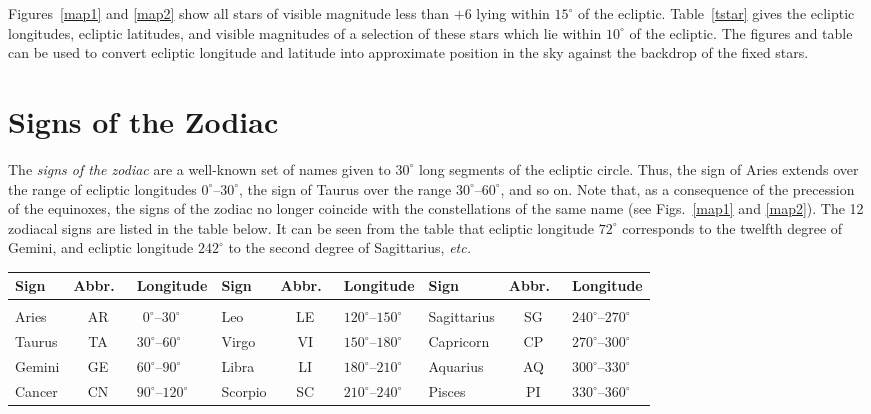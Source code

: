 Figures~\ref{map1} and \ref{map2} show all stars of visible magnitude less than $+6$ lying
within $15^\circ$ of the ecliptic. Table~\ref{tstar} gives the ecliptic longitudes, ecliptic latitudes, and
visible magnitudes of a selection
of these stars which lie within $10^\circ$ of the ecliptic. The figures and table can
be used 
 to convert ecliptic longitude and latitude into approximate position
in the sky against the backdrop of the fixed stars.

\section{Signs of the Zodiac}\label{szod}
The {\em signs of the zodiac}  are a well-known set of names given
to $30^\circ$ long segments of the ecliptic circle. Thus, the sign of Aries extends
over the range of ecliptic longitudes $0^\circ$--$30^\circ$, the sign of Taurus
over the range $30^\circ$--$60^\circ$, and so on. Note that, as
a consequence of the precession of the equinoxes, the signs
of the zodiac no longer coincide with the constellations of the same name
(see Figs.~\ref{map1} and \ref{map2}).
The 12 zodiacal signs are listed in the table below.  It can be seen from the table that ecliptic longitude $72^\circ$ corresponds to the
twelfth degree of Gemini, and ecliptic longitude $242^\circ$  to the second degree of
Sagittarius, {\em etc.}
\begin{table}[h]
\centering
\begin{tabular}{lcl|lcl|lcl}
Sign & Abbr.\ & Longitude & Sign & Abbr.\ &Longitude & Sign & Abbr.\ &  Longitude\\[-0.0ex]\hline
&&&&&&&&\\[-1.8ex]
Aries & AR & $~~0^\circ$--$30^\circ$ & Leo & LE & $120^\circ$--$150^\circ$&Sagittarius & SG & $240^\circ$--$270^\circ$\\
Taurus & TA & $30^\circ$--$60^\circ$ & Virgo & VI & $150^\circ$--$180^\circ$ & Capricorn & CP & $270^\circ$--$300^\circ$\\
Gemini & GE & $60^\circ$--$90^\circ$ & Libra & LI & $180^\circ$--$210^\circ$ & Aquarius & AQ & $300^\circ$--$330^\circ$\\
Cancer & CN & $90^\circ$--$120^\circ$ & Scorpio & SC & $210^\circ$--$240^\circ$ & Pisces & PI & $330^\circ$--$360^\circ$\\
\end{tabular}
\end{table}

